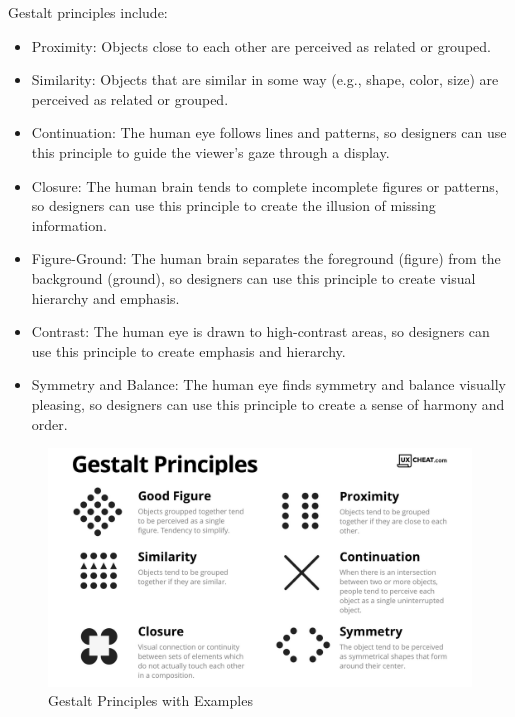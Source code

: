 \documentclass[
]{article}
\providecommand{\tightlist}{%
  \setlength{\itemsep}{0pt}\setlength{\parskip}{0pt}}
\begin{document}

Gestalt principles include:

\begin{itemize}
\tightlist
\item
  Proximity: Objects close to each other are perceived as related or
  grouped.
\item
  Similarity: Objects that are similar in some way (e.g., shape, color,
  size) are perceived as related or grouped.
\item
  Continuation: The human eye follows lines and patterns, so designers
  can use this principle to guide the viewer's gaze through a display.
\item
  Closure: The human brain tends to complete incomplete figures or
  patterns, so designers can use this principle to create the illusion
  of missing information.
\item
  Figure-Ground: The human brain separates the foreground (figure) from
  the background (ground), so designers can use this principle to create
  visual hierarchy and emphasis.
\item
  Contrast: The human eye is drawn to high-contrast areas, so designers
  can use this principle to create emphasis and hierarchy.
\item
  Symmetry and Balance: The human eye finds symmetry and balance
  visually pleasing, so designers can use this principle to create a
  sense of harmony and order.
\end{itemize}

\begin{figure}

{\centering \includegraphics[width=0.75\linewidth]{figure/gestalt_principles} 

}

\caption{Gestalt Principles with Examples}\label{fig:gestalt}
\end{figure}
\end{document}

